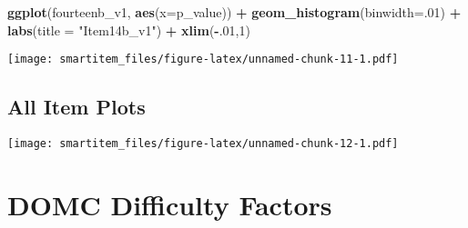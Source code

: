 \documentclass[]{book}
\newenvironment{Shaded}{\begin{snugshade}}{\end{snugshade}}
\newcommand{\KeywordTok}[1]{\textcolor[rgb]{0.13,0.29,0.53}{\textbf{#1}}}
\newcommand{\DataTypeTok}[1]{\textcolor[rgb]{0.13,0.29,0.53}{#1}}
\newcommand{\DecValTok}[1]{\textcolor[rgb]{0.00,0.00,0.81}{#1}}
\newcommand{\StringTok}[1]{\textcolor[rgb]{0.31,0.60,0.02}{#1}}
\newcommand{\OperatorTok}[1]{\textcolor[rgb]{0.81,0.36,0.00}{\textbf{#1}}}
\newcommand{\NormalTok}[1]{#1}
\theoremstyle{definition}
\theoremstyle{definition}
\theoremstyle{definition}
\theoremstyle{remark}
\begin{document}
\begin{Shaded}
\begin{Highlighting}[]
\KeywordTok{ggplot}\NormalTok{(fourteenb_v1, }\KeywordTok{aes}\NormalTok{(}\DataTypeTok{x=}\NormalTok{p_value)) }\OperatorTok{+}\StringTok{ }\KeywordTok{geom_histogram}\NormalTok{(}\DataTypeTok{binwidth=}\NormalTok{.}\DecValTok{01}\NormalTok{) }\OperatorTok{+}\StringTok{ }\KeywordTok{labs}\NormalTok{(}\DataTypeTok{title =} \StringTok{"Item14b_v1"}\NormalTok{) }\OperatorTok{+}\StringTok{ }\KeywordTok{xlim}\NormalTok{(}\OperatorTok{-}\NormalTok{.}\DecValTok{01}\NormalTok{,}\DecValTok{1}\NormalTok{)}
\end{Highlighting}
\end{Shaded}

\texttt{[image: smartitem\_files/figure-latex/unnamed-chunk-11-1.pdf]}

\section{All Item Plots}\label{all-item-plots}

\begin{Shaded}
\end{Shaded}

\texttt{[image: smartitem\_files/figure-latex/unnamed-chunk-12-1.pdf]}

\chapter{DOMC Difficulty Factors}\label{domc-difficulty-factors}
\end{document}
